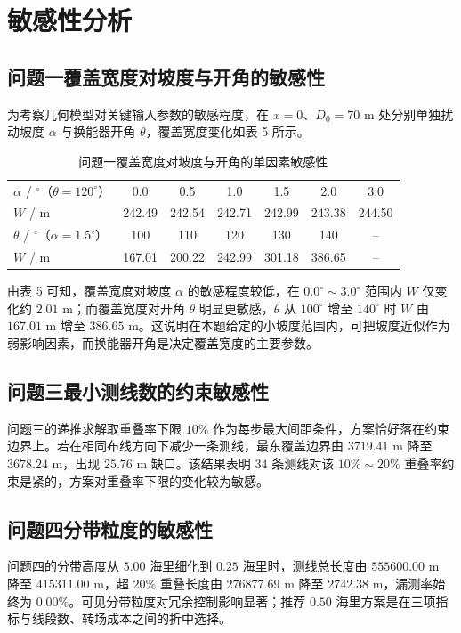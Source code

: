 \section{敏感性分析}

\subsection{问题一覆盖宽度对坡度与开角的敏感性}

为考察几何模型对关键输入参数的敏感程度，在 $x=0$、$D_0=70\text{ m}$ 处分别单独扰动坡度 $\alpha$ 与换能器开角 $\theta$，覆盖宽度变化如表 5 所示。

\begin{table}[H]
  \centering
  \caption{问题一覆盖宽度对坡度与开角的单因素敏感性}
  \label{tab:sens}
  \begin{tabular}{lcccccc}
    \toprule
    $\alpha$ / $^\circ$（$\theta=120^\circ$） & 0.0 & 0.5 & 1.0 & 1.5 & 2.0 & 3.0 \\
    $W$ / m & 242.49 & 242.54 & 242.71 & 242.99 & 243.38 & 244.50 \\
    \midrule
    $\theta$ / $^\circ$（$\alpha=1.5^\circ$） & 100 & 110 & 120 & 130 & 140 & -- \\
    $W$ / m & 167.01 & 200.22 & 242.99 & 301.18 & 386.65 & -- \\
    \bottomrule
  \end{tabular}
\end{table}

由表 5 可知，覆盖宽度对坡度 $\alpha$ 的敏感程度较低，在 $0.0^\circ\sim3.0^\circ$ 范围内 $W$ 仅变化约 $2.01\text{ m}$；而覆盖宽度对开角 $\theta$ 明显更敏感，$\theta$ 从 $100^\circ$ 增至 $140^\circ$ 时 $W$ 由 $167.01\text{ m}$ 增至 $386.65\text{ m}$。这说明在本题给定的小坡度范围内，可把坡度近似作为弱影响因素，而换能器开角是决定覆盖宽度的主要参数。

\subsection{问题三最小测线数的约束敏感性}

问题三的递推求解取重叠率下限 $10\%$ 作为每步最大间距条件，方案恰好落在约束边界上。若在相同布线方向下减少一条测线，最东覆盖边界由 $3719.41\text{ m}$ 降至 $3678.24\text{ m}$，出现 $25.76\text{ m}$ 缺口。该结果表明 $34$ 条测线对该 $10\%\sim20\%$ 重叠率约束是紧的，方案对重叠率下限的变化较为敏感。

\subsection{问题四分带粒度的敏感性}

问题四的分带高度从 $5.00$ 海里细化到 $0.25$ 海里时，测线总长度由 $555600.00\text{ m}$ 降至 $415311.00\text{ m}$，超 $20\%$ 重叠长度由 $276877.69\text{ m}$ 降至 $2742.38\text{ m}$，漏测率始终为 $0.00\%$。可见分带粒度对冗余控制影响显著；推荐 $0.50$ 海里方案是在三项指标与线段数、转场成本之间的折中选择。
